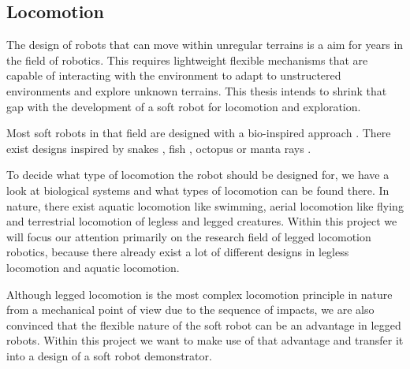 \subsection*{Locomotion}
The design of robots that can move within unregular terrains is a aim for years in the field of robotics. This requires lightweight flexible mechanisms that are capable of interacting
 with the environment to adapt to unstructered environments and explore unknown terrains. This thesis intends to shrink that gap with the development of a soft robot for locomotion and exploration.
 \par
 Most soft robots in that field are designed with a bio-inspired approach \cite{Kim2013,Trivedi2008}. There exist designs inspired by snakes \cite{Onal2013, Qi2020, Branyan2017_conf},
 fish \cite{Hou2019_conf,Hu2020,Marchese2014}, octopus \cite{OBrien2001_conf,Neppalli2007_conf} or manta rays \cite{Suzumori2007_conf,Cai2009_conf}.
%
\par
To decide what type of locomotion the robot should be designed for, we have a look at biological systems and what types of locomotion can be found there. In nature, there exist aquatic
locomotion like swimming, aerial locomotion like flying and terrestrial locomotion of legless and legged creatures. Within this project we will focus our attention primarily on the 
research field of legged locomotion robotics, because there already exist a lot of different designs in legless locomotion and aquatic locomotion. 
\par
Although legged locomotion is the most complex locomotion principle in nature from a mechanical point of view due to the sequence of impacts, we are also convinced that the flexible nature of the soft robot can be an 
advantage in legged robots.  Within this project we want to make use of that advantage and transfer it into a design of a soft robot demonstrator. 
%
%
%
%
